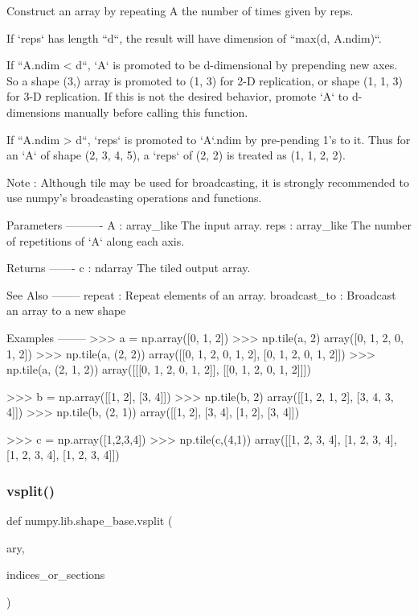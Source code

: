 \begin{DoxyVerb}Construct an array by repeating A the number of times given by reps.

If `reps` has length ``d``, the result will have dimension of
``max(d, A.ndim)``.

If ``A.ndim < d``, `A` is promoted to be d-dimensional by prepending new
axes. So a shape (3,) array is promoted to (1, 3) for 2-D replication,
or shape (1, 1, 3) for 3-D replication. If this is not the desired
behavior, promote `A` to d-dimensions manually before calling this
function.

If ``A.ndim > d``, `reps` is promoted to `A`.ndim by pre-pending 1's to it.
Thus for an `A` of shape (2, 3, 4, 5), a `reps` of (2, 2) is treated as
(1, 1, 2, 2).

Note : Although tile may be used for broadcasting, it is strongly
recommended to use numpy's broadcasting operations and functions.

Parameters
----------
A : array_like
    The input array.
reps : array_like
    The number of repetitions of `A` along each axis.

Returns
-------
c : ndarray
    The tiled output array.

See Also
--------
repeat : Repeat elements of an array.
broadcast_to : Broadcast an array to a new shape

Examples
--------
>>> a = np.array([0, 1, 2])
>>> np.tile(a, 2)
array([0, 1, 2, 0, 1, 2])
>>> np.tile(a, (2, 2))
array([[0, 1, 2, 0, 1, 2],
       [0, 1, 2, 0, 1, 2]])
>>> np.tile(a, (2, 1, 2))
array([[[0, 1, 2, 0, 1, 2]],
       [[0, 1, 2, 0, 1, 2]]])

>>> b = np.array([[1, 2], [3, 4]])
>>> np.tile(b, 2)
array([[1, 2, 1, 2],
       [3, 4, 3, 4]])
>>> np.tile(b, (2, 1))
array([[1, 2],
       [3, 4],
       [1, 2],
       [3, 4]])

>>> c = np.array([1,2,3,4])
>>> np.tile(c,(4,1))
array([[1, 2, 3, 4],
       [1, 2, 3, 4],
       [1, 2, 3, 4],
       [1, 2, 3, 4]])
\end{DoxyVerb}
 \mbox{\label{namespacenumpy_1_1lib_1_1shape__base_a24b4c2509402097020e58f4e855c303f}} 
\subsubsection{\texorpdfstring{vsplit()}{vsplit()}}
{\footnotesize\ttfamily def numpy.\+lib.\+shape\+\_\+base.\+vsplit (\begin{DoxyParamCaption}\item[{}]{ary,  }\item[{}]{indices\+\_\+or\+\_\+sections }\end{DoxyParamCaption})}

